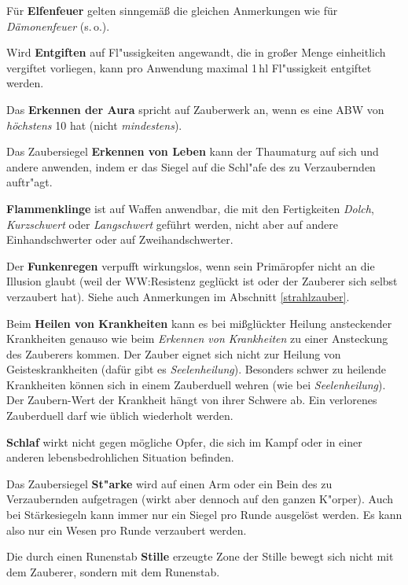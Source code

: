 \documentclass[10pt,a4paper,germanpar]{article}
\begin{document}
Für \textbf{Elfenfeuer} gelten sinngemäß die gleichen Anmerkungen
wie für \emph{Dämonenfeuer} (s.\,o.).

Wird \textbf{Entgiften} auf Fl"ussigkeiten angewandt, die in großer
Menge einheitlich vergiftet vorliegen, kann pro Anwendung maximal
1\,hl Fl"ussigkeit entgiftet werden.

Das \textbf{Erkennen der Aura} spricht auf Zauberwerk an, wenn es eine ABW von
\emph{höchstens} 10 hat (nicht \emph{mindestens}).

Das Zaubersiegel \textbf{Erkennen von Leben} kann der Thaumaturg auf
sich und andere anwenden, indem er das Siegel auf die Schl"afe des zu
Verzaubernden auftr"agt.

\textbf{Flammenklinge} ist auf Waffen anwendbar, die mit den
Fertigkeiten \emph{Dolch}, \emph{Kurzschwert} oder \emph{Langschwert}
geführt werden, nicht aber auf andere Einhandschwerter oder auf
Zweihandschwerter.

Der \textbf{Funkenregen} verpufft wirkungslos, wenn sein Primäropfer
nicht an die Illusion glaubt (weil der WW:Resistenz geglückt ist oder
der Zauberer sich selbst verzaubert hat). Siehe auch Anmerkungen im
Abschnitt \ref{strahlzauber}.

Beim \textbf{Heilen von Krankheiten} kann es bei mißglückter Heilung
ansteckender Krankheiten genauso wie beim \emph{Erkennen von
  Krankheiten} zu einer Ansteckung des Zauberers kommen. Der Zauber
eignet sich nicht zur Heilung von Geisteskrankheiten (dafür gibt es
\emph{Seelenheilung}). Besonders schwer zu heilende Krankheiten können
sich in einem Zauberduell wehren (wie bei \emph{Seelenheilung}). Der
Zaubern-Wert der Krankheit hängt von ihrer Schwere ab. Ein verlorenes
Zauberduell darf wie üblich wiederholt werden.

\textbf{Schlaf} wirkt nicht gegen mögliche Opfer, die sich im Kampf
oder in einer anderen lebensbedrohlichen Situation befinden.

Das Zaubersiegel \textbf{St"arke} wird auf einen Arm oder ein Bein des 
zu Verzaubernden aufgetragen (wirkt aber dennoch auf den ganzen
K"orper). Auch bei Stärkesiegeln kann immer nur ein Siegel pro Runde ausgelöst
werden. Es kann also nur ein Wesen pro Runde verzaubert werden.

Die durch einen Runenstab \textbf{Stille} erzeugte Zone der Stille
bewegt sich nicht mit dem Zauberer, sondern mit dem Runenstab.

%
\end{document}
